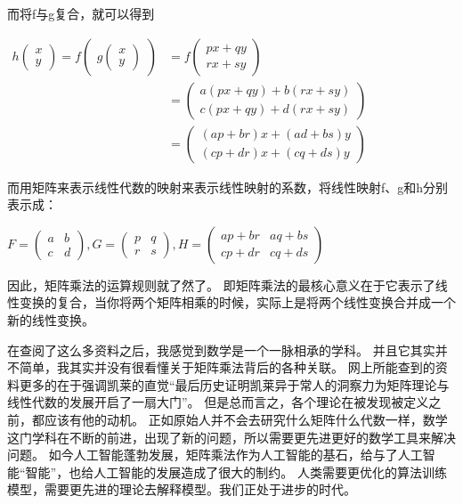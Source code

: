 \documentclass[12pt,a4paper]{article}%
\begin{document}
而将f与g复合，就可以得到

\begin{center}
$
\begin{aligned}
h\begin{pmatrix}
    x \\
    y
\end{pmatrix}=f\begin{pmatrix}
    g\begin{pmatrix}
        x \\
        y
    \end{pmatrix}
\end{pmatrix}&=f\begin{pmatrix}
    px+qy \\
    rx+sy
\end{pmatrix}\\&=
\begin{pmatrix}
    a(px+qy)+b(rx+sy) \\
    c(px+qy)+d(rx+sy)
\end{pmatrix}
    \\&=
    \begin{pmatrix}
        (ap+br)x+(ad+bs)y \\
        (cp+dr)x+(cq+ds)y
    \end{pmatrix}
\end{aligned}
$
\end{center}
而用矩阵来表示线性代数的映射来表示线性映射的系数，将线性映射f、g和h分别表示成：

\begin{center}
$
F=\begin{pmatrix}
    a & b \\
    c & d
\end{pmatrix}, G=\begin{pmatrix}
    p & q \\
    r & s
\end{pmatrix}, H=\begin{pmatrix}
    ap+br & aq+bs \\
    cp+dr & cq+ds
\end{pmatrix}
$
\end{center}

因此，矩阵乘法的运算规则就了然了。
即矩阵乘法的最核心意义在于它表示了线性变换的复合，当你将两个矩阵相乘的时候，实际上是将两个线性变换合并成一个新的线性变换。

在查阅了这么多资料之后，我感觉到数学是一个一脉相承的学科。
并且它其实并不简单，我其实并没有很看懂关于矩阵乘法背后的各种关联。
网上所能查到的资料更多的在于强调凯莱的直觉“最后历史证明凯莱异于常人的洞察力为矩阵理论与线性代数的发展开启了一扇大门”。
但是总而言之，各个理论在被发现被定义之前，都应该有他的动机。
正如原始人并不会去研究什么矩阵什么代数一样，数学这门学科在不断的前进，出现了新的问题，所以需要更先进更好的数学工具来解决问题。
如今人工智能蓬勃发展，矩阵乘法作为人工智能的基石，给与了人工智能“智能”，也给人工智能的发展造成了很大的制约。
人类需要更优化的算法训练模型，需要更先进的理论去解释模型。我们正处于进步的时代。
\end{document}
